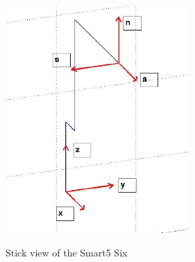\documentclass[english,a4paper,11pt]{report}
\begin{document}
	
	\begin{figure} 
		\vspace{-1cm}

 		 \begin{center}
  			\includegraphics[width=7cm]{images_not_compressed/alphaAngles.png}
			\label{alpha}
			\caption{Stick view of the Smart5 Six}
 		 \end{center}
	\end{figure} 
	
	\vspace{1cm}
	
\end{document}
